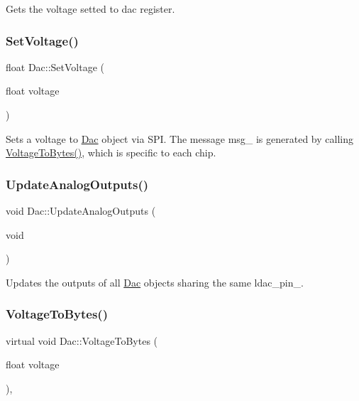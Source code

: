 Gets the voltage setted to dac register. \mbox{\label{classDac_a71ede236baa8fc67d18db38629e6c225}} 
\subsubsection{\texorpdfstring{Set\+Voltage()}{SetVoltage()}}
{\footnotesize\ttfamily float Dac\+::\+Set\+Voltage (\begin{DoxyParamCaption}\item[{float}]{voltage }\end{DoxyParamCaption})}

Sets a voltage to \mbox{\hyperlink{classDac}{Dac}} object via S\+PI. The message msg\+\_\+ is generated by calling \mbox{\hyperlink{classDac_ac21022b2b921437418004af9ae7de8ae}{Voltage\+To\+Bytes()}}, which is specific to each chip. \mbox{\label{classDac_aafef1707ec33a2166a69e9b646cd471b}} 
\subsubsection{\texorpdfstring{Update\+Analog\+Outputs()}{UpdateAnalogOutputs()}}
{\footnotesize\ttfamily void Dac\+::\+Update\+Analog\+Outputs (\begin{DoxyParamCaption}\item[{void}]{ }\end{DoxyParamCaption})}

Updates the outputs of all \mbox{\hyperlink{classDac}{Dac}} objects sharing the same ldac\+\_\+pin\+\_\+. \mbox{\label{classDac_ac21022b2b921437418004af9ae7de8ae}} 
\subsubsection{\texorpdfstring{Voltage\+To\+Bytes()}{VoltageToBytes()}}
{\footnotesize\ttfamily virtual void Dac\+::\+Voltage\+To\+Bytes (\begin{DoxyParamCaption}\item[{float}]{voltage }\end{DoxyParamCaption})\hspace{0.3cm}{\ttfamily [protected]}, {}}

